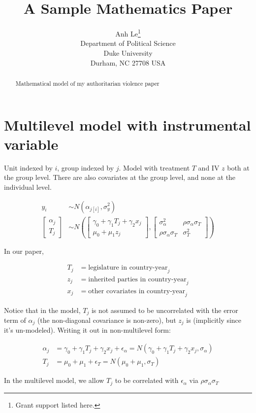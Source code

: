 \documentclass[12pt]{article}
\newcommand{\col}[1]{\left[\begin{matrix} #1 \end{matrix} \right]}
\begin{document}
\nocite{*}

\title{A Sample Mathematics Paper}

\author{Anh Le\thanks{Grant support listed here.} \\ 
Department of Political Science \\
Duke University \\
Durham, NC 27708 USA}

\maketitle

\begin{abstract}
  Mathematical model of my authoritarian violence paper
\end{abstract}


\section{Multilevel model with instrumental variable}

Unit indexed by $i$, group indexed by $j$. Model with treatment $T$ and IV $z$ both at the group level. There are also covariates at the group level, and none at the individual level.

\begin{align}
y_i &\sim N(\alpha_{j[i]}, \sigma_y^2) \\
\col{\alpha_j \\ T_j} &\sim 
N \left(
    \col{\gamma_0 + \gamma_1 T_j + \gamma_2 x_j\\\mu_0 + \mu_1 z_j} ,
    \left[
    \begin{matrix}
      \sigma^2_\alpha & \rho \sigma_\alpha \sigma_T \\
      \rho \sigma_\alpha \sigma_T & \sigma^2_T
    \end{matrix}
    \right]
\right)
\end{align}

In our paper,

\begin{align}
T_j &= \text{legislature in country-year}_j \\
z_j &= \text{inherited parties in country-year}_j \\
x_j &= \text{other covariates in country-year}_j
\end{align}

Notice that in the model, $T_j$ is not assumed to be uncorrelated with the error term of $\alpha_j$ (the non-diagonal covariance is non-zero), but $z_j$ is (implicitly since it's un-modeled). Writing it out in non-multilevel form:

\begin{align}
\alpha_j &= \gamma_0 + \gamma_1 T_j + \gamma_2 x_j + \epsilon_\alpha = N(\gamma_0 + \gamma_1 T_j + \gamma_2 x_j, \sigma_\alpha)\\
T_j &= \mu_0 + \mu_1 + \epsilon_T = N(\mu_0 + \mu_1, \sigma_T)
\end{align}

In the multilevel model, we allow $T_j$ to be correlated with $\epsilon_\alpha$ via $\rho \sigma_\alpha \sigma_T$
\end{document}
